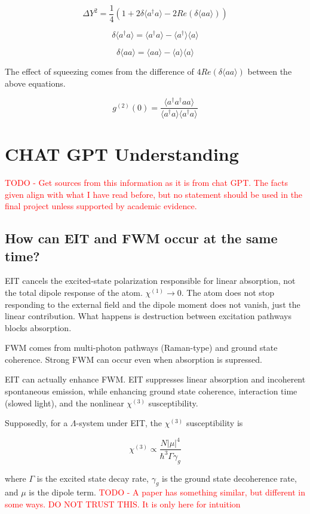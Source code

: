 \documentclass[aps,pra,twocolumn,showpacs,amsmath,amssymb,nofootinbib,longbibliography,superscriptaddress
]{revtex4-1}
\theoremstyle{definition}
\theoremstyle{remark}
\newcommand{\0}{\hat{0}}
\begin{document}
$$
\Delta Y^2 = \frac{1}{4} (1 + 2 \delta \langle a^{\dagger} a \rangle  - 2Re(\delta \langle a a \rangle))
$$

$$
\delta \langle a^{\dagger} a \rangle = \langle a^{\dagger} a \rangle - \langle a^{\dagger} \rangle \langle a \rangle
$$

$$
\delta \langle a a \rangle = \langle a a \rangle - \langle a \rangle \langle a \rangle
$$

The effect of squeezing comes from the difference of $4Re(\delta \langle a a \rangle)$  between the above equations.

$$
g^{(2)}(0) = \frac{\langle a^{\dagger} a^{\dagger} a a\rangle}{\langle a^{\dagger} a\rangle \langle a^{\dagger} a\rangle}
$$


\section{CHAT GPT Understanding}

\textcolor{red}{TODO - Get sources from this information as it is from chat GPT. The facts given align with what I have read before, but no statement should be used in the final project unless supported by academic evidence.}

\subsection{How can EIT and FWM occur at the same time?}

EIT cancels the excited-state polarization responsible for linear absorption, not the total dipole response of the atom. $\chi^{(1)} \rightarrow 0$. The atom does not stop responding to the external field and the dipole moment does not vanish, just the linear contribution. What happens is destruction between excitation pathways blocks absorption.

FWM comes from multi-photon pathways (Raman-type) and ground state coherence. Strong FWM can occur even when absorption is supressed.

EIT can actually enhance FWM. EIT suppresses linear absorption and incoherent spontaneous emission, while enhancing ground state coherence, interaction time (slowed light), and the nonlinear $\chi^{(3)}$ susceptibility.

Supposedly, for a $\Lambda$-system under EIT, the $\chi^{(3)}$ susceptibility is 

$$
\chi^{(3)} \propto \frac{N |\mu|^4}{\hbar^3 \Gamma \gamma_g}
$$

where $\Gamma$ is the excited state decay rate, $\gamma_g$ is the ground state decoherence rate, and $\mu$ is the dipole term. \textcolor{red}{TODO - A paper has something similar, but different in some ways. DO NOT TRUST THIS. It is only here for intuition}
\end{document}
